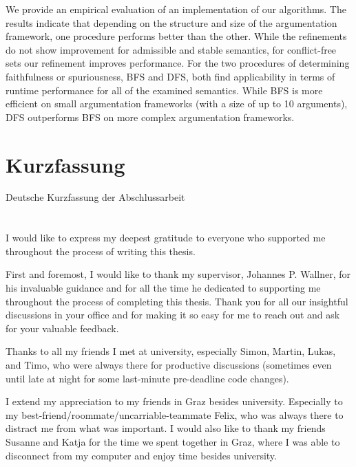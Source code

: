 \documentclass[twoside,openright]{scrreprt}
\begin{document}
We provide an empirical evaluation of an implementation of our algorithms. The results indicate that depending on the structure and size of the argumentation framework, one procedure performs better than the other. While the refinements do not show improvement for admissible and stable semantics, for conflict-free sets our refinement improves performance. For the two procedures of determining faithfulness or spuriousness, BFS and DFS, both find applicability in terms of runtime performance for all of the examined semantics. While BFS is more efficient on small argumentation frameworks (with a size of up to 10 arguments), DFS outperforms BFS on more complex argumentation frameworks.







\chapter*{Kurzfassung}

Deutsche Kurzfassung der Abschlussarbeit


\cleardoublepage

\chapter*{}

I would like to express my deepest gratitude to everyone who supported me throughout the process of writing this thesis.

First and foremost, I would like to thank my supervisor, Johannes P. Wallner, for his invaluable guidance and for all the time he dedicated to supporting me throughout the process of completing this thesis. Thank you for all our insightful discussions in your office and for making it so easy for me to reach out and ask for your valuable feedback.

Thanks to all my friends I met at university, especially Simon, Martin, Lukas, and Timo, who were always there for productive discussions (sometimes even until late at night for some last-minute pre-deadline code changes).

I extend my appreciation to my friends in Graz besides university. Especially to my best-friend/roommate/uncarriable-teammate Felix, who was always there to distract me from what was important. I would also like to thank my friends Susanne and Katja for the time we spent together in Graz, where I was able to disconnect from my computer and enjoy time besides university.
\end{document}
